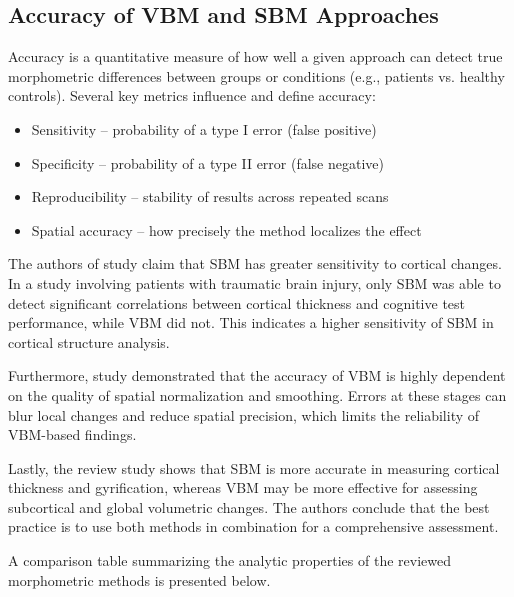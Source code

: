 \documentclass[default]{subfiles}
\begin{document}
\subsection{Accuracy of VBM and SBM Approaches}

Accuracy is a quantitative measure of how well a given approach can detect true morphometric differences between groups
or conditions (e.g., patients vs. healthy controls).
Several key metrics influence and define accuracy:\newline

\begin{itemize}
    \item Sensitivity – probability of a type I error (false positive)
    \item Specificity – probability of a type II error (false negative)
    \item Reproducibility – stability of results across repeated scans
    \item Spatial accuracy – how precisely the method localizes the effect\newline
\end{itemize}

The authors of study \cite{upadhyay_2014} claim that SBM has greater sensitivity to cortical changes. In a study
involving patients with traumatic brain injury, only SBM was able to detect significant correlations between cortical
thickness and cognitive test performance, while VBM did not. This indicates a higher sensitivity of SBM in cortical
structure analysis.

Furthermore, study \cite{friston_2004} demonstrated that the accuracy of VBM is highly dependent on the quality of
spatial normalization and smoothing. Errors at these stages can blur local changes and reduce spatial precision, which
limits the reliability of VBM-based findings.

Lastly, the review study \cite{goto_2022} shows that SBM is more accurate in measuring cortical thickness and
gyrification, whereas VBM may be more effective for assessing subcortical and global volumetric changes. The authors
conclude that the best practice is to use both methods in combination for a comprehensive assessment.

A comparison table summarizing the analytic properties of the reviewed morphometric methods is presented below.
\end{document}
